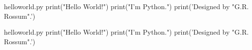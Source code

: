 \documentclass{beamer}
\begin{document}
\vbg
\begin{frame}[fragile]

\begin{pycode}{helloworld.py}
print("Hello World!")
print("I'm Python.")
print('Designed by "G.R. Rossum".')
\end{pycode}

\end{frame}

\vbg
\begin{frame}[fragile]
\begin{pycode}{helloworld.py}
print("Hello World!")
print("I'm Python.")
print('Designed by "G.R. Rossum".')
\end{pycode}

\end{frame}

\episodeisdone
\end{document}
